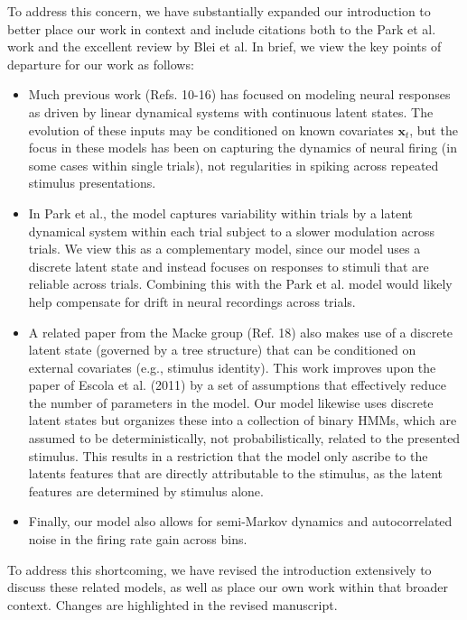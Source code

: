 \documentclass[12pt,a4paper]{article}
\newcommand{\edit}[1]{\textcolor{edit}{#1}}
\begin{document}
\edit{
To address this concern, we have substantially expanded our introduction to better place our work in context and include citations both to the Park et al. work and the excellent review by Blei et al. In brief, we view the key points of departure for our work as follows:
\begin{itemize}
    \item Much previous work (Refs. 10-16) has focused on modeling neural responses as driven by linear dynamical systems with continuous latent states. The evolution of these inputs may be conditioned on known covariates $\mathbf{x}_t$, but the focus in these models has been on capturing the dynamics of neural firing (in some cases within single trials), not regularities in spiking across repeated stimulus presentations.
    \item In Park et al., the model captures variability within trials by a latent dynamical system within each trial subject to a slower modulation across trials. We view this as a complementary model, since our model uses a discrete latent state and instead focuses on responses to stimuli that are reliable across trials. Combining this with the Park et al. model would likely help compensate for drift in neural recordings across trials.
    \item A related paper from the Macke group (Ref. 18) also makes use of a discrete latent state (governed by a tree structure) that can be conditioned on external covariates (e.g., stimulus identity). This work improves upon the paper of Escola et al. (2011) by a set of assumptions that effectively reduce the number of parameters in the model. Our model likewise uses discrete latent states but organizes these into a collection of binary HMMs, which are assumed to be deterministically, not probabilistically, related to the presented stimulus. This results in a restriction that the model only ascribe to the latents features that are directly attributable to the stimulus, as the latent features are determined by stimulus alone.
    \item Finally, our model also allows for semi-Markov dynamics and autocorrelated noise in the firing rate gain across bins.
\end{itemize}
}

\edit{
To address this shortcoming, we have revised the introduction extensively to discuss these related models, as well as place our own work within that broader context. Changes are highlighted in the revised manuscript.
}
\end{document}
